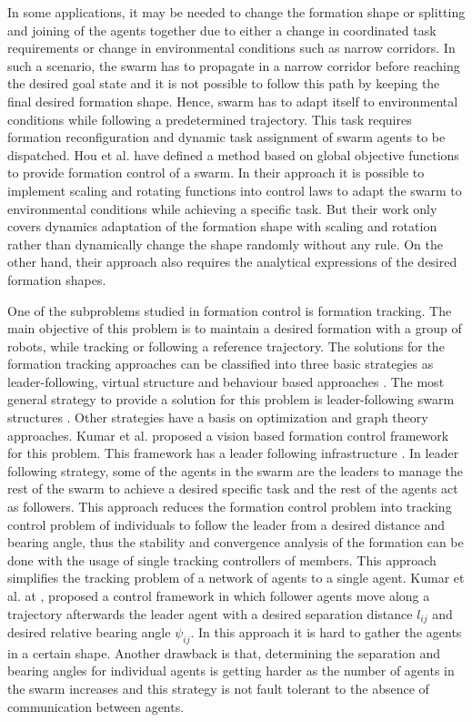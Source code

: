 \documentclass[letterpaper, 10 pt, conference]{ieeeconf}  %
\begin{document}
In some applications, it may be needed to change the formation shape or splitting and joining of the agents together due to either a change in coordinated task requirements or change in environmental conditions such as narrow corridors. In such a scenario, the swarm has to propagate in a narrow corridor before reaching the desired goal state and it is not possible to follow this path by keeping the final desired formation shape. Hence, swarm has to adapt itself to environmental conditions while following a predetermined trajectory. This task requires formation reconfiguration and dynamic task assignment of swarm agents to be dispatched. Hou et al. \cite{8} have defined a method based on global objective functions to provide formation control of a swarm. In their approach it is possible to implement scaling and rotating functions into control laws to adapt the swarm to environmental conditions while achieving a specific task. But their work only covers dynamics adaptation of the formation shape with scaling and rotation rather than dynamically change the shape randomly without any rule. On the other hand, their approach also requires the analytical expressions of the desired formation shapes.

One of the subproblems studied in formation control is formation tracking. The main objective of this problem is to maintain a desired formation with a group of robots, while tracking or following a reference trajectory. The solutions for the formation tracking approaches can be classified into three basic strategies as leader-following, virtual structure and behaviour based approaches \cite{12}. The most general strategy to provide a solution for this problem is leader-following swarm structures \cite{18}. Other strategies have a basis on optimization and graph theory approaches. Kumar et al. proposed a vision based formation control framework  for this problem. This framework has a leader following infrastructure \cite{18}. In leader following strategy, some of the agents in the swarm are the leaders to manage the rest of the swarm to achieve a desired specific task and the rest of the agents act as followers. This approach reduces the formation control problem into tracking control problem of individuals to follow the leader from a desired distance and bearing angle, thus the stability and convergence analysis of the formation can be done with the usage of single tracking controllers of members. This approach simplifies the tracking problem of a network of agents to a single agent. Kumar et al. at \cite{18}, proposed a control framework in which follower agents move along a trajectory afterwards the leader agent with a desired separation distance $l_{ij}$ and desired relative bearing angle $\psi_{ij}$. In this approach it is hard to gather the agents in a certain shape. Another drawback is that, determining the separation and bearing angles for individual agents is getting harder as the number of agents in the swarm increases and this strategy is not fault tolerant to the absence of communication between agents.
\end{document}
